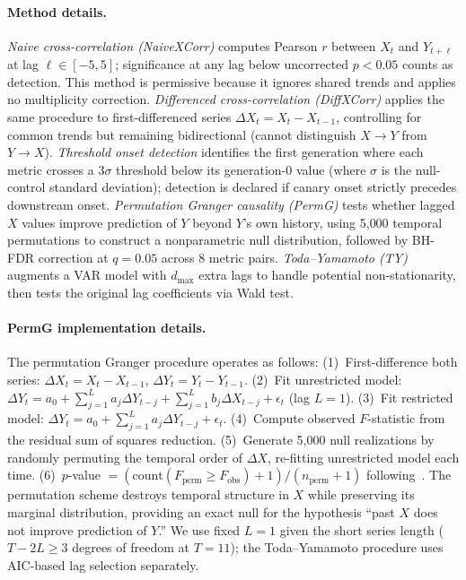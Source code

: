 \paragraph{Method details.}
\emph{Naive cross-correlation (NaiveXCorr)} computes Pearson $r$ between $X_{t}$ and $Y_{t+\ell}$ at lag $\ell \in [-5, 5]$; significance at any lag below uncorrected $p{<}0.05$ counts as detection.
This method is permissive because it ignores shared trends and applies no multiplicity correction.
\emph{Differenced cross-correlation (DiffXCorr)} applies the same procedure to first-differenced series $\Delta X_t = X_t - X_{t-1}$, controlling for common trends but remaining bidirectional (cannot distinguish $X \to Y$ from $Y \to X$).
\emph{Threshold onset detection} identifies the first generation where each metric crosses a $3\sigma$ threshold below its generation-0 value (where $\sigma$ is the null-control standard deviation); detection is declared if canary onset strictly precedes downstream onset.
\emph{Permutation Granger causality (PermG)} tests whether lagged $X$ values improve prediction of $Y$ beyond $Y$'s own history, using 5{,}000 temporal permutations to construct a nonparametric null distribution, followed by BH-FDR correction at $q{=}0.05$ across 8 metric pairs.
\emph{Toda--Yamamoto (TY)} augments a VAR model with $d_{\max}$ extra lags to handle potential non-stationarity, then tests the original lag coefficients via Wald test.

\paragraph{PermG implementation details.}
The permutation Granger procedure operates as follows:
(1)~First-difference both series: $\Delta X_t = X_t - X_{t-1}$, $\Delta Y_t = Y_t - Y_{t-1}$.
(2)~Fit unrestricted model: $\Delta Y_t = a_0 + \sum_{j=1}^{L} a_j \Delta Y_{t-j} + \sum_{j=1}^{L} b_j \Delta X_{t-j} + \epsilon_t$ (lag $L{=}1$).
(3)~Fit restricted model: $\Delta Y_t = a_0 + \sum_{j=1}^{L} a_j \Delta Y_{t-j} + \epsilon_t$.
(4)~Compute observed $F$-statistic from the residual sum of squares reduction.
(5)~Generate 5{,}000 null realizations by randomly permuting the temporal order of $\Delta X$, re-fitting unrestricted model each time.
(6)~$p$-value $= (\text{count}(F_{\text{perm}} \geq F_{\text{obs}}) + 1) / (n_{\text{perm}} + 1)$ following~\citet{phipson2010permutation}.
The permutation scheme destroys temporal structure in $X$ while preserving its marginal distribution, providing an exact null for the hypothesis ``past $X$ does not improve prediction of $Y$.''
We use fixed $L{=}1$ given the short series length ($T{-}2L \geq 3$ degrees of freedom at $T{=}11$); the Toda--Yamamoto procedure uses AIC-based lag selection separately.

